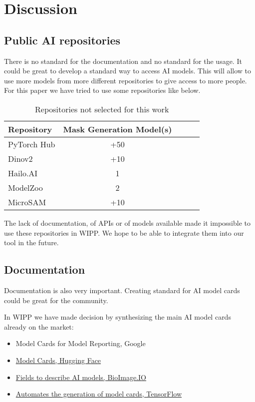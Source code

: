 \section{Discussion}
\label{sec:discussion}

\subsection{Public AI repositories}

There is no standard for the documentation and no standard for the usage.
It could be great to develop a standard
way to access AI models. This will allow to use more models from more different
repositories to give access to more people. For this paper we have tried to use
some repositories like below.

\begin{table}[H]
    \centering
    \caption{\label{tab:discussion}%
        Repositories not selected for this work
    }
    \begin{tabular}{lcccc}
      \toprule
      Repository & Mask Generation Model(s) \\
      \midrule
      PyTorch Hub & +50 \\
      Dinov2 & +10 \\
      Hailo.AI & 1 \\
      ModelZoo & 2 \\
      MicroSAM & +10 \\
      \bottomrule
    \end{tabular}
\end{table}

The lack of documentation, of APIs or of models available made it impossible to
use these repositories in WIPP. We hope to be able to integrate them into our
tool in the future.

\subsection{Documentation}

Documentation is also very important. Creating standard for AI model cards
could be great for the community.

In WIPP we have made decision by synthesizing the main AI model cards
already on the market:
\begin{itemize}
    \item Model Cards for Model Reporting, Google \cite{DBLP:journals/corr/abs-1810-03993}
    \item \href{https://huggingface.co/docs/hub/en/model-cards}{Model Cards, Hugging Face}
    \item \href{https://bioimage.io/docs/#/bioimageio_model_spec}{Fields to describe AI models, BioImage.IO}
    \item \href{https://github.com/tensorflow/model-card-toolkit}{Automates the generation of model cards, TensorFlow}
\end{itemize}




